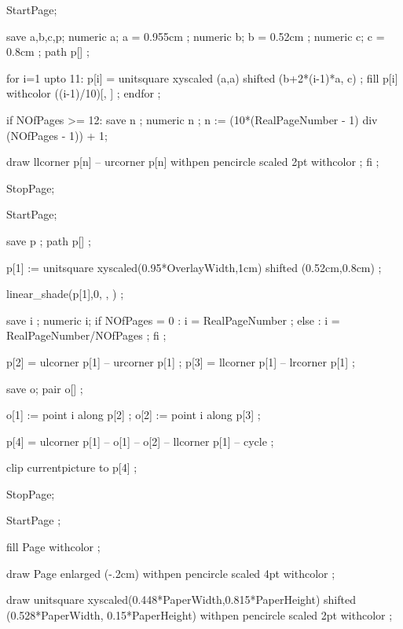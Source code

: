 StartPage;

save a,b,c,p;
numeric a; a = 0.955cm ;
numeric b; b = 0.52cm ;
numeric c; c = 0.8cm ;
path p[] ;

for i=1 upto 11:
	p[i] = unitsquare xyscaled (a,a) shifted (b+2*(i-1)*a, c) ;
    fill p[i] withcolor ((i-1)/10)[,
                                   ] ;
endfor ;

if NOfPages >= 12:
  save n ; numeric n ;
  n := (10*(RealPageNumber - 1) div (NOfPages - 1)) + 1;

  draw llcorner p[n] -- urcorner p[n]
         withpen pencircle scaled 2pt
         withcolor  ;
fi ;

StopPage;
\stopuseMPgraphic

StartPage;

save p ;
path p[] ;

p[1] := unitsquare xyscaled(0.95*OverlayWidth,1cm) shifted (0.52cm,0.8cm) ;

linear_shade(p[1],0,
            ,
            ) ;

save i ;
numeric i;
if NOfPages = 0 :
  i = RealPageNumber ;
else :
  i = RealPageNumber/NOfPages ;
fi ;

p[2] = ulcorner p[1] -- urcorner p[1] ;
p[3] = llcorner p[1] -- lrcorner p[1] ;

save o;
pair o[] ;

o[1] := point i along p[2] ;
o[2] := point i along p[3] ;

p[4] = ulcorner p[1] -- o[1] -- o[2] -- llcorner p[1] -- cycle ;

clip currentpicture to p[4] ;

StopPage;
\stopuseMPgraphic

StartPage ;

fill Page withcolor  ;

draw Page enlarged (-.2cm)
          withpen pencircle scaled 4pt
          withcolor  ;

draw unitsquare
     xyscaled(0.448*PaperWidth,0.815*PaperHeight)
     shifted (0.528*PaperWidth, 0.15*PaperHeight)
     withpen pencircle scaled 2pt
     withcolor  ;

